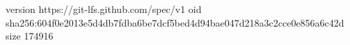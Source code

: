 version https://git-lfs.github.com/spec/v1
oid sha256:604f0e2013e5d4db7fdba6be7dcf5bed4d94bae047d218a3c2cce0e856a6c42d
size 174916
